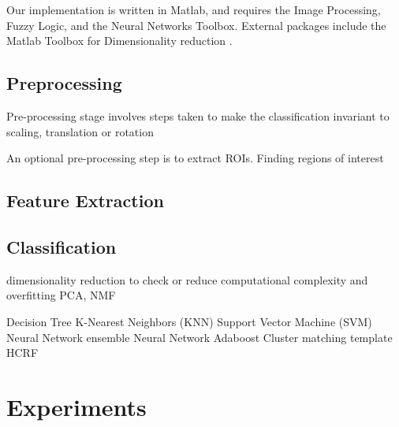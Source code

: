 \documentclass[10pt,twocolumn,letterpaper]{article}
\begin{document}
Our implementation is written in Matlab, and requires the Image Processing, Fuzzy Logic, and the Neural Networks Toolbox. External packages include the Matlab Toolbox for Dimensionality reduction \cite{drtoolbox}.

\subsection{Preprocessing}
Pre-processing stage involves steps taken to make the classification invariant to scaling, translation or rotation


An optional pre-processing step is to extract ROIs. 
Finding regions of interest

\subsection{Feature Extraction}

\subsection{Classification}

dimensionality reduction to check or reduce computational complexity and overfitting
PCA, NMF


Decision Tree
K-Nearest Neighbors (KNN)
Support Vector Machine (SVM)
Neural Network
ensemble Neural Network
Adaboost
Cluster matching template
HCRF


\section{Experiments} 
\end{document}
